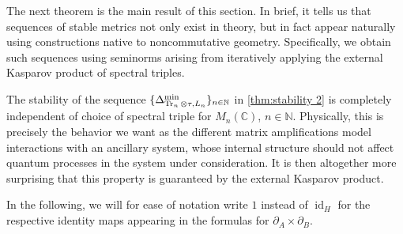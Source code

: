 \documentclass[11pt, a4paper, oneside, final, reqno]{amsart}
\newcommand{\bbN}{\mathbb{N}}
\newcommand{\bbC}{\mathbb{C}}
\newcommand{\id}{\operatorname{id}}
\newcommand{\Tr}{\operatorname{Tr}}
\theoremstyle{definition}
\theoremstyle{plain}
\theoremstyle{remark}
\numberwithin{equation}{section}
\begin{document}
The next theorem is the main result of this section. 
In brief, it tells us that sequences of stable metrics not only exist in theory, but in fact appear naturally using constructions native to noncommutative geometry. 
Specifically, we obtain such sequences using seminorms arising from iteratively applying the external Kasparov product of spectral triples. 

The stability of the sequence $\{\Delta_{\Tr_n \otimes \tau, L_n}^{\rm min}\}_{n \in \bbN}$ in \cref{thm:stability 2} is completely independent of choice of spectral triple for $M_n(\bbC)$, $n \in \bbN$. Physically, this is precisely the behavior we want as the different matrix amplifications model interactions with an ancillary system, whose internal structure should not affect quantum processes in the system under consideration. It is then altogether more surprising that this property is guaranteed by the external Kasparov product. 

In the following, we will for ease of notation write $1$ instead of $\id_H$ for the respective identity maps appearing in the formulas for $\partial_A \times \partial_B$.
\end{document}

